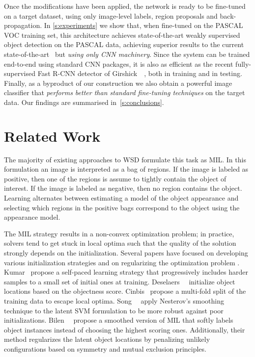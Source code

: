 \documentclass[10pt,twocolumn,letterpaper]{article}
\begin{document}
Once the modifications have been applied, the network is ready to be fine-tuned on a target dataset, using only image-level labels, region proposals and back-propagation. In \cref{s:experiments} we show that, when fine-tuned on the PASCAL VOC training set, this architecture achieves state-of-the-art weakly supervised object detection on the PASCAL data, achieving superior results to the current state-of-the-art~\cite{Wang14a} but \emph{using only CNN machinery}. Since the system can be trained end-to-end using standard CNN packages, it is also as efficient as the recent fully-supervised Fast R-CNN detector of Girshick~\etal~\cite{Girshick15}, both in training and in testing. Finally, as a byproduct of our construction we also obtain a powerful image classifier that \emph{performs better than standard fine-tuning techniques} on the target data. Our findings are summarised in~\cref{s:conclusions}.


\section{Related Work}\label{s:related}
The majority of existing approaches to WSD formulate this task as  MIL. In this formulation an image is interpreted as a bag of regions. If the image is labeled as positive, then one of the regions is assume to tightly contain the object of interest. If the image is labeled as negative, then no region contains the object. Learning alternates between estimating a model of the object appearance and selecting which regions in the positive bags correspond to the object using the appearance model. 

The MIL strategy results in a non-convex optimization problem; in practice, solvers tend to get stuck in local optima such that the quality of the solution strongly depends on the initialization. Several papers have focused on developing various initialization strategies \cite{Kumar10a,Deselaers10,Song14a,Cinbis15} and on regularizing the optimization problem \cite{Song14,Bilen14}. Kumar~\etal\cite{Kumar10a} propose a self-paced learning strategy that progressively includes harder samples to a small set of initial ones at training. Deselaers~\etal~\cite{Deselaers10} initialize object locations based on the objectness score. Cinbis~\etal\cite{Cinbis15} propose a multi-fold split of the training data to escape local optima. Song~\etal~\cite{Song14} apply Nesterov's smoothing technique \cite{Nesterov05} to the latent SVM formulation \cite{Felzenszwalb10a} to be more robust against poor initializations. Bilen~\etal~\cite{Bilen14} propose a smoothed version of MIL that softly labels object instances instead of choosing the highest scoring ones. Additionally, their method regularizes the latent object locations by penalizing unlikely configurations based on symmetry and mutual exclusion principles.
\end{document}
